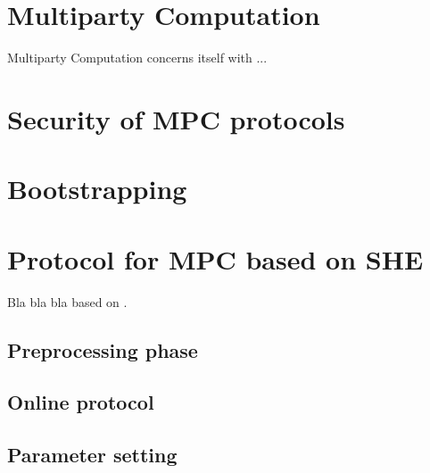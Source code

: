 \documentclass[../main.tex]{subfiles}
\begin{document}
\section{Multiparty Computation}
Multiparty Computation concerns itself with ...
\section{Security of MPC protocols}
\section{Bootstrapping}
\section{Protocol for MPC based on SHE}
Bla bla bla based on \cite{damgaard2012multiparty}.
\subsection{Preprocessing phase}
\subsection{Online protocol}
\subsection{Parameter setting}
\end{document}
